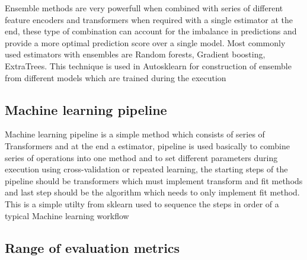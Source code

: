 Ensemble methods are very powerfull when combined with series of different feature encoders and transformers when required with a single estimator at the end, these type of combination can account for the imbalance in predictions and provide a more optimal prediction score over a single model. Most commonly used estimators with ensembles are Random forests, Gradient boosting, ExtraTrees. This technique is used in Autosklearn for construction of ensemble from different models which are trained during the execution

\subsection{Machine learning pipeline}
Machine learning pipeline is a simple method which consists of series of Transformers and at the end a estimator, pipeline is used basically to combine series of operations into one method and to set different parameters during execution using cross-validation or repeated learning, the starting steps of the pipeline should be transformers which must implement transform and fit methods and last step should be the algorithm which needs to only implement fit method. This is a simple utilty from sklearn\cite{scikit-learn} used to sequence the steps in order of a typical Machine learning workflow


\subsection{Range of evaluation metrics}

